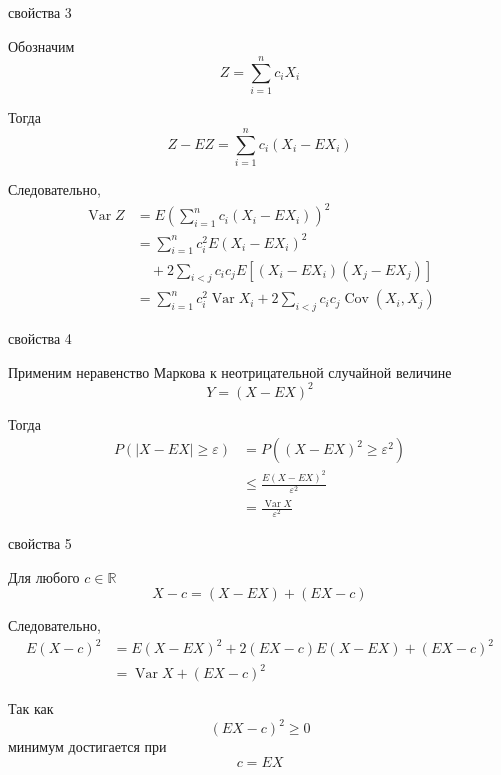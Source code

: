 \documentclass[12pt,a4paper]{article}
\begin{document}
\begin{proofbox}{свойства 3}

Обозначим
\[
Z=\sum_{i=1}^n c_iX_i
\]

Тогда
\[
Z-EZ
=
\sum_{i=1}^n c_i(X_i-EX_i)
\]

Следовательно,
\[
\begin{aligned}
\operatorname{Var}Z
&=
E\left(
\sum_{i=1}^n c_i(X_i-EX_i)
\right)^2\\
&=
\sum_{i=1}^n
c_i^2E(X_i-EX_i)^2\\
&\quad+
2\sum_{i<j}
c_ic_j
E\left[(X_i-EX_i)(X_j-EX_j)\right]\\
&=
\sum_{i=1}^n c_i^2\operatorname{Var}X_i
+
2\sum_{i<j}c_ic_j\operatorname{Cov}(X_i,X_j)
\end{aligned}
\]

\end{proofbox}

\begin{proofbox}{свойства 4}

Применим неравенство Маркова к неотрицательной случайной величине
\[
Y=(X-EX)^2
\]

Тогда
\[
\begin{aligned}
P(|X-EX|\geq\varepsilon)
&=
P\left((X-EX)^2\geq\varepsilon^2\right)\\
&\leq
\frac{E(X-EX)^2}{\varepsilon^2}\\
&=
\frac{\operatorname{Var}X}{\varepsilon^2}
\end{aligned}
\]

\end{proofbox}

\begin{proofbox}{свойства 5}

Для любого $c\in\mathbb{R}$
\[
X-c
=
(X-EX)+(EX-c)
\]

Следовательно,
\[
\begin{aligned}
E(X-c)^2
&=
E(X-EX)^2
+
2(EX-c)E(X-EX)
+
(EX-c)^2\\
&=
\operatorname{Var}X+(EX-c)^2
\end{aligned}
\]

Так как
\[
(EX-c)^2\geq0
\]
минимум достигается при
\[
c=EX
\]

\end{proofbox}
\end{document}
